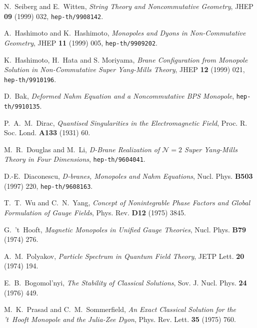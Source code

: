 \documentclass[a4paper,12pt]{article}
\begin{document}
\begin{thebibliography}{10}

 N.~Seiberg and E.~Witten, \textit{String Theory and
             Noncommutative Geometry}, JHEP {\bf 09} (1999) 032,
             \texttt{hep-th/9908142}.

 A.~Hashimoto and K.~Hashimoto, \textit{Monopoles and Dyons in
             Non-Commutative Geometry}, JHEP {\bf 11} (1999) 005,
             \texttt{hep-th/9909202}.

 K.~Hashimoto, H.~Hata and S. Moriyama, \textit{Brane 
             Conf\mbox{}iguration from Monopole Solution in Non-Commutative 
             Super Yang-Mills Theory}, JHEP {\bf 12} (1999) 021,
             \texttt{hep-th/9910196}.

 D.~Bak, \textit{Deformed Nahm Equation and a Noncommutative
             BPS Monopole}, \texttt{hep-th/9910135}.

 P.~A.~M.~Dirac, \textit{Quantised Singularities in the 
             Electromagnetic Field}, Proc. R. Soc. Lond. {\bf A133} (1931) 60.

 M.~R.~Douglas and M.~Li, \textit{D-Brane Realization of 
             $\mathcal{N}=2$ Super Yang-Mills Theory in Four Dimensions},
             \texttt{hep-th/9604041}.

 D.-E.~Diaconescu, \textit{D-branes, Monopoles and Nahm 
              Equations}, Nucl. Phys. {\bf B503} (1997) 220, 
              \texttt{hep-th/9608163}.

 T.~T.~Wu and C.~N.~Yang, \textit{Concept of Nonintegrable Phase
             Factors and Global Formulation of Gauge Fields}, Phys. Rev.
             {\bf D12} (1975) 3845. 

 G.~'t~Hooft, \textit{Magnetic Monopoles in Unif\mbox{}ied Gauge
             Theories}, Nucl. Phys. {\bf B79} (1974) 276.

 A.~M.~Polyakov, \textit{Particle Spectrum in Quantum Field
             Theory}, JETP Lett. {\bf 20} (1974) 194.

 E.~B.~Bogomol'nyi, \textit{The Stability of Classical Solutions},
             Sov. J. Nucl. Phys. {\bf 24} (1976) 449.

 M.~K.~Prasad and C.~M.~Sommerf\mbox{}ield, 
             \textit{An Exact Classical
             Solution for the 't~Hooft Monopole and the Julia-Zee Dyon},
             Phys. Rev. Lett. {\bf 35} (1975) 760. 


\end{thebibliography}
\end{document}

